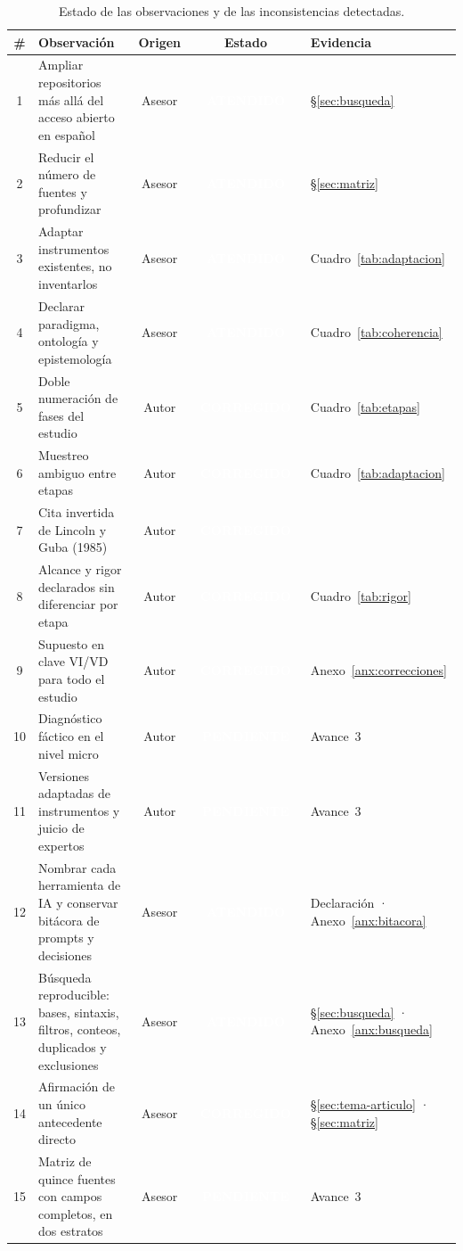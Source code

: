 \documentclass[letter,12pt]{article}
\newcommand{\bOK}{\colorbox{colorPropuesto}{\textcolor{white}{\scriptsize\textbf{~ATENDIDO~}}}}
\newcommand{\bCOR}{\colorbox{colorNuevo}{\textcolor{white}{\scriptsize\textbf{~CORREGIDO~}}}}
\newcommand{\bPEN}{\colorbox{colorOriginal}{\textcolor{white}{\scriptsize\textbf{~PENDIENTE~}}}}
\begin{document}
\begin{table}[H]
\centering
\footnotesize
\caption{Estado de las observaciones y de las inconsistencias detectadas.}
\label{tab:tablero-correcciones}
\renewcommand{\arraystretch}{1.28}
\begin{tabular}{|c|p{5.6cm}|c|c|p{2.8cm}|}
\hline
\rowcolor{bgCotejo}
\textbf{\#} & \textbf{Observación} & \textbf{Origen} & \textbf{Estado} & \textbf{Evidencia} \\
\hline
1 & Ampliar repositorios más allá del acceso abierto en español & Asesor & \bOK & \S\ref{sec:busqueda} \\
\hline
2 & Reducir el número de fuentes y profundizar & Asesor & \bOK & \S\ref{sec:matriz} \\
\hline
3 & Adaptar instrumentos existentes, no inventarlos & Asesor & \bOK & Cuadro~\ref{tab:adaptacion} \\
\hline
4 & Declarar paradigma, ontología y epistemología & Asesor & \bOK & Cuadro~\ref{tab:coherencia} \\
\hline
5 & Doble numeración de fases del estudio & Autor & \bCOR & Cuadro~\ref{tab:etapas} \\
\hline
6 & Muestreo ambiguo entre etapas & Autor & \bCOR & Cuadro~\ref{tab:adaptacion} \\
\hline
7 & Cita invertida de Lincoln y Guba (1985) & Autor & \bCOR & \citep{lincolnguba1985} \\
\hline
8 & Alcance y rigor declarados sin diferenciar por etapa & Autor & \bCOR & Cuadro~\ref{tab:rigor} \\
\hline
9 & Supuesto en clave VI/VD para todo el estudio & Autor & \bCOR & Anexo~\ref{anx:correcciones} \\
\hline
10 & Diagnóstico fáctico en el nivel micro & Autor & \bPEN & Avance~3 \\
\hline
11 & Versiones adaptadas de instrumentos y juicio de expertos & Autor & \bPEN & Avance~3 \\
\hline
12 & Nombrar cada herramienta de IA y conservar bitácora de prompts y decisiones & Asesor & \bOK & Declaración · Anexo~\ref{anx:bitacora} \\
\hline
13 & Búsqueda reproducible: bases, sintaxis, filtros, conteos, duplicados y exclusiones & Asesor & \bOK & \S\ref{sec:busqueda} · Anexo~\ref{anx:busqueda} \\
\hline
14 & Afirmación de un único antecedente directo & Asesor & \bCOR & \S\ref{sec:tema-articulo} · \S\ref{sec:matriz} \\
\hline
15 & Matriz de quince fuentes con campos completos, en dos estratos & Asesor & \bPEN & Avance~3 \\
\hline
\end{tabular}
\end{table}
\end{document}

